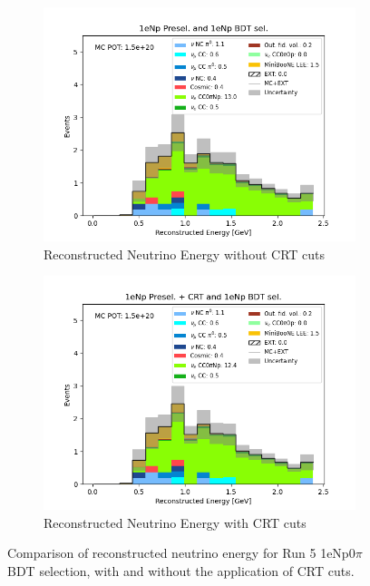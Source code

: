 \begin{figure}[H] \centering
    \begin{subfigure}[t]{0.45\linewidth}
        \includegraphics[width=\linewidth]{technote/EventSelections/FiguresCRT/NPBDT.png}
        \caption{Reconstructed Neutrino Energy without CRT cuts}
    \end{subfigure}%
    \hspace{0.45cm}%
    \begin{subfigure}[t]{0.45\linewidth}
        \includegraphics[width=\linewidth]{technote/EventSelections/FiguresCRT/NPBDTCRT.png}%
        \caption{Reconstructed Neutrino Energy with CRT cuts}
    \end{subfigure}%
    \caption{Comparison of reconstructed neutrino energy for Run 5 1eNp0$\pi$ BDT selection, with and without the application of CRT cuts.}
    \label{fig:1eNp_BDT}
\end{figure}

